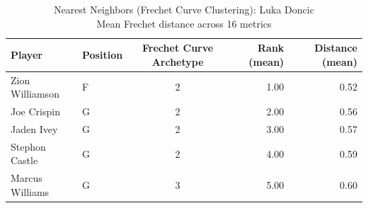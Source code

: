 \begin{table}[t]
\caption*{
{\fontsize{20}{25} Nearest Neighbors (Frechet Curve Clustering): Luka Doncic\fontsize{12}{15}\selectfont } \\ 
{\fontsize{14}{17}\selectfont  Mean Frechet distance across 16 metrics\fontsize{12}{15}\selectfont }
} 
\fontsize{12.0pt}{14.0pt}\selectfont
\begin{tabular*}{\linewidth}{@{\extracolsep{\fill}}llcrr}
\toprule
Player & Position & Frechet Curve Archetype & Rank (mean) & Distance (mean) \\ 
\midrule\addlinespace[2.5pt]
Zion Williamson & F & 2 & 1.00 & 0.52 \\ 
Joe Crispin & G & 2 & 2.00 & 0.56 \\ 
Jaden Ivey & G & 2 & 3.00 & 0.57 \\ 
Stephon Castle & G & 2 & 4.00 & 0.59 \\ 
Marcus Williams & G & 3 & 5.00 & 0.60 \\ 
\bottomrule
\end{tabular*}
\end{table}


